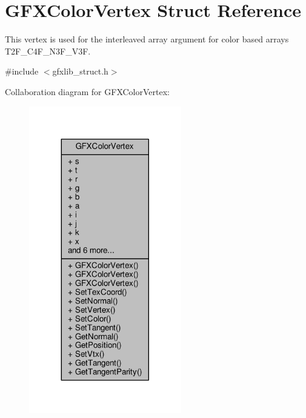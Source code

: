 \hypertarget{structGFXColorVertex}{}\section{G\+F\+X\+Color\+Vertex Struct Reference}
\label{structGFXColorVertex}


This vertex is used for the interleaved array argument for color based arrays T2\+F\+\_\+\+C4\+F\+\_\+\+N3\+F\+\_\+\+V3F.  




{\ttfamily \#include $<$gfxlib\+\_\+struct.\+h$>$}



Collaboration diagram for G\+F\+X\+Color\+Vertex\+:
\nopagebreak
\begin{figure}[H]
\begin{center}
\leavevmode
\includegraphics[width=188pt]{df/dbf/structGFXColorVertex__coll__graph}
\end{center}
\end{figure}
